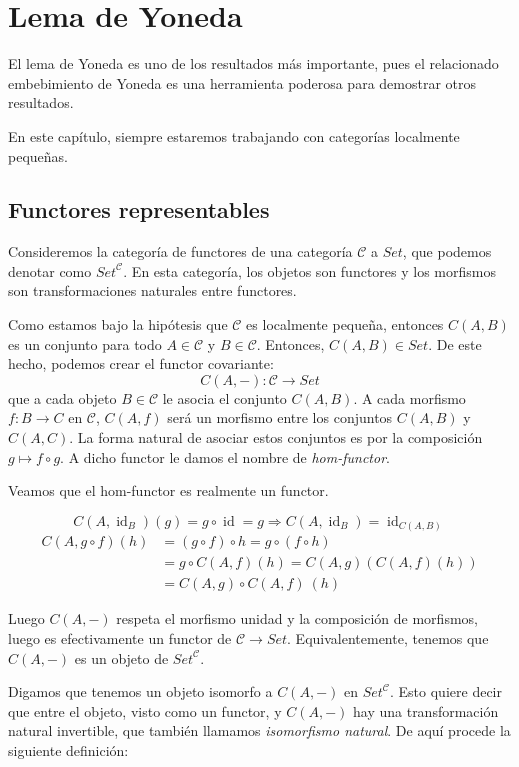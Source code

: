 \documentclass[12pt, twoside]{book}
\newcommand{\cat}{{\mathcal{C}}}
\newcommand{\Set}{{Set}}
\DeclareMathOperator{\id}{id}
\begin{document}
\chapter{Lema de Yoneda}

El lema de Yoneda es uno de los resultados más importante, pues el relacionado embebimiento de Yoneda es una herramienta poderosa para demostrar otros resultados.

En este capítulo, siempre estaremos trabajando con categorías localmente pequeñas.

\section{Functores representables}
Consideremos la categoría de functores de una categoría $\cat$ a $\Set$, que podemos denotar como $\Set^\cat$.
En esta categoría, los objetos son functores y los morfismos son transformaciones naturales entre functores.

Como estamos bajo la hipótesis que $\cat$ es localmente pequeña, entonces $C(A,B)$ es un conjunto para todo $A \in \cat$ y $B \in \cat$.
Entonces, $C(A,B) \in \Set$.
De este hecho, podemos crear el functor covariante:
\[ C(A,-) \colon \cat \to \Set \]
que a cada objeto $B \in \cat$ le asocia el conjunto $C(A,B)$.
A cada morfismo $f \colon B \to C$ en $\cat$, $C(A,f)$ será un morfismo entre los conjuntos $C(A,B)$ y $C(A,C)$.
La forma natural de asociar estos conjuntos es por la composición $g \mapsto f \circ g$.
A dicho functor le damos el nombre de \emph{hom-functor}.

Veamos que el hom-functor es realmente un functor.

\[ C(A,\id_B)(g) = g \circ \id = g \Rightarrow C(A,\id_B) = \id_{C(A,B)} \]
\begin{align*}
C(A,g \circ f)(h) & = (g \circ f) \circ h = g \circ (f \circ h)\\
& = g \circ C(A,f)(h) = C(A,g)(C(A,f)(h))\\
& = C(A,g) \circ C(A,f)\ (h)
\end{align*}

Luego $C(A,-)$ respeta el morfismo unidad y la composición de morfismos, luego es efectivamente un functor de $\cat \to \Set$.
Equivalentemente, tenemos que $C(A,-)$ es un objeto de $\Set^\cat$.

Digamos que tenemos un objeto isomorfo a $C(A,-)$ en $\Set^\cat$.
Esto quiere decir que entre el objeto, visto como un functor, y $C(A,-)$ hay una transformación natural invertible, que también llamamos \emph{isomorfismo natural}.
De aquí procede la siguiente definición: 
\end{document}
